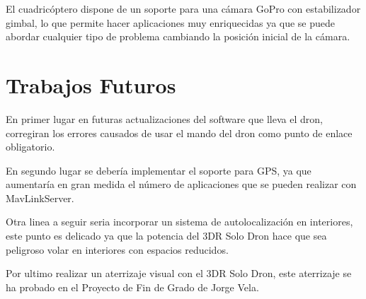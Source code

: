 El cuadricóptero dispone de un soporte para una cámara GoPro con estabilizador gimbal, lo que permite hacer aplicaciones muy enriquecidas ya que se puede abordar cualquier tipo de problema cambiando la posición inicial de la cámara.

\section{Trabajos Futuros}

En primer lugar en futuras actualizaciones del software que lleva el dron, corregiran los errores causados de usar el mando del dron como punto de enlace obligatorio. 

En segundo lugar se debería implementar el soporte para GPS, ya que aumentaría en gran medida el número de aplicaciones que se pueden realizar con MavLinkServer. 

Otra linea a seguir seria incorporar un sistema de autolocalización en interiores, este punto es delicado ya que la potencia del 3DR Solo Dron hace que sea peligroso volar en interiores con espacios reducidos.

Por ultimo realizar un aterrizaje visual con el 3DR Solo Dron, este aterrizaje se ha probado en el Proyecto de Fin de Grado de Jorge Vela.

